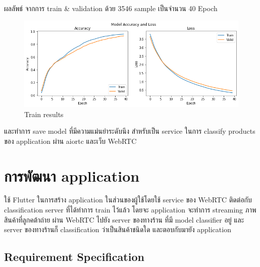 \par ผลลัพธ์ จากการ train \& validation ด้วย 3546 sample เป็นจำนวน 40 Epoch
\begin{figure}[h]
  \begin{center}
  \includegraphics[scale=0.45]{pic/train.png}
  \end{center}
  
  \caption[Train results]{Train results}
  \label{fig:Train results}
  \end{figure}


  และทำการ save model ที่มีความแม่นยำระดับนึง
   สำหรับเป็น service ในการ classify products ของ application ผ่าน aiortc  และเว็บ WebRTC



\newpage

\section{การพัฒนา application }
ใช้ Flutter ในการสร้าง application ในส่วนของผู้ใช้โดยใช้ service ของ WebRTC ติดต่อกับ classification server ที่ได้ทำการ train ไว้แล้ว
โดยจะ application จะทำการ streaming ภาพสินค้าที่ลูกคต้าถ่าย ผ่าน WebRTC ไปยัง server ของทางร้าน ที่มี model classifier อยู่
และ server ของทางร้านก็ classification ว่าเป็นสินค้าชนิดใด และตอบกับมายัง application
\subsection{Requirement Specification}  

